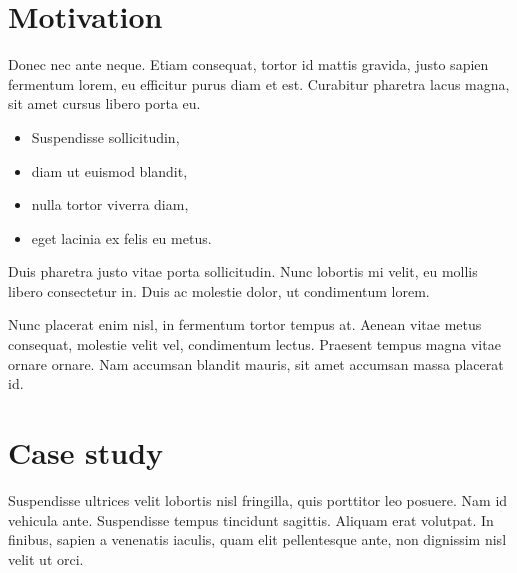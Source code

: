 \documentclass[wind]{tudposter} %
\begin{document}
\begin{multicols}{2}
\section{Motivation}	
Donec nec ante neque. Etiam consequat, tortor id mattis gravida, justo sapien fermentum lorem, eu efficitur purus diam et est. Curabitur pharetra lacus magna, sit amet cursus libero porta eu. 
\begin{itemize}[noitemsep,leftmargin=3cm,labelsep=7mm,label=\textcolor{tudblue}{$\bullet$}]
	\item Suspendisse sollicitudin,
	\item diam ut euismod blandit,
	\item nulla tortor viverra diam,
	\item eget lacinia ex felis eu metus.
\end{itemize} 
Duis pharetra justo vitae porta sollicitudin. Nunc lobortis mi velit, eu mollis libero consectetur in. Duis ac molestie dolor, ut condimentum lorem.

Nunc placerat enim nisl, in fermentum tortor tempus at. Aenean vitae metus consequat, molestie velit vel, condimentum lectus. Praesent tempus magna vitae ornare ornare. Nam accumsan blandit mauris, sit amet accumsan massa placerat id.

\section{Case study}
Suspendisse ultrices velit lobortis nisl fringilla, quis porttitor leo posuere. Nam id vehicula ante. Suspendisse tempus tincidunt sagittis. Aliquam erat volutpat. In finibus, sapien a venenatis iaculis, quam elit pellentesque ante, non dignissim nisl velit ut orci.


\end{multicols}
\end{document}
